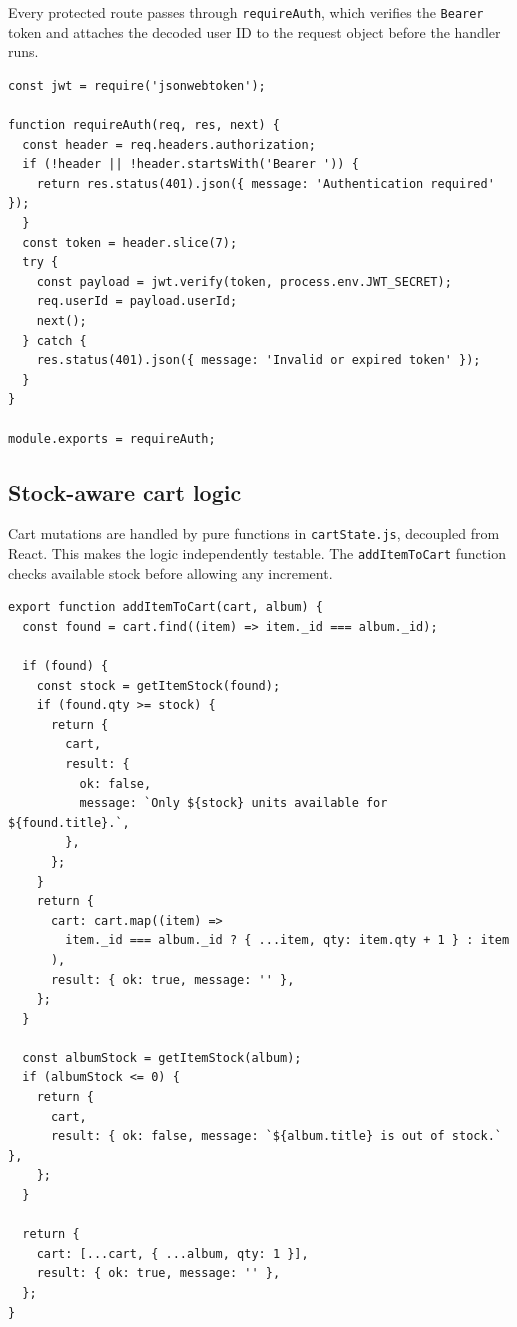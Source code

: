 \documentclass[11pt, a4paper]{report}
\begin{document}
Every protected route passes through \texttt{requireAuth}, which verifies the \texttt{Bearer} token and attaches the decoded user ID to the request object before the handler runs.

\begin{lstlisting}[caption={server/middleware/requireAuth.js}]
const jwt = require('jsonwebtoken');

function requireAuth(req, res, next) {
  const header = req.headers.authorization;
  if (!header || !header.startsWith('Bearer ')) {
    return res.status(401).json({ message: 'Authentication required' });
  }
  const token = header.slice(7);
  try {
    const payload = jwt.verify(token, process.env.JWT_SECRET);
    req.userId = payload.userId;
    next();
  } catch {
    res.status(401).json({ message: 'Invalid or expired token' });
  }
}

module.exports = requireAuth;
\end{lstlisting}

\subsection*{Stock-aware cart logic}

Cart mutations are handled by pure functions in \texttt{cartState.js}, decoupled from React. This makes the logic independently testable. The \texttt{addItemToCart} function checks available stock before allowing any increment.

\begin{lstlisting}[caption={client/src/cartState.js — addItemToCart()}]
export function addItemToCart(cart, album) {
  const found = cart.find((item) => item._id === album._id);

  if (found) {
    const stock = getItemStock(found);
    if (found.qty >= stock) {
      return {
        cart,
        result: {
          ok: false,
          message: `Only ${stock} units available for ${found.title}.`,
        },
      };
    }
    return {
      cart: cart.map((item) =>
        item._id === album._id ? { ...item, qty: item.qty + 1 } : item
      ),
      result: { ok: true, message: '' },
    };
  }

  const albumStock = getItemStock(album);
  if (albumStock <= 0) {
    return {
      cart,
      result: { ok: false, message: `${album.title} is out of stock.` },
    };
  }

  return {
    cart: [...cart, { ...album, qty: 1 }],
    result: { ok: true, message: '' },
  };
}
\end{lstlisting}
\end{document}
